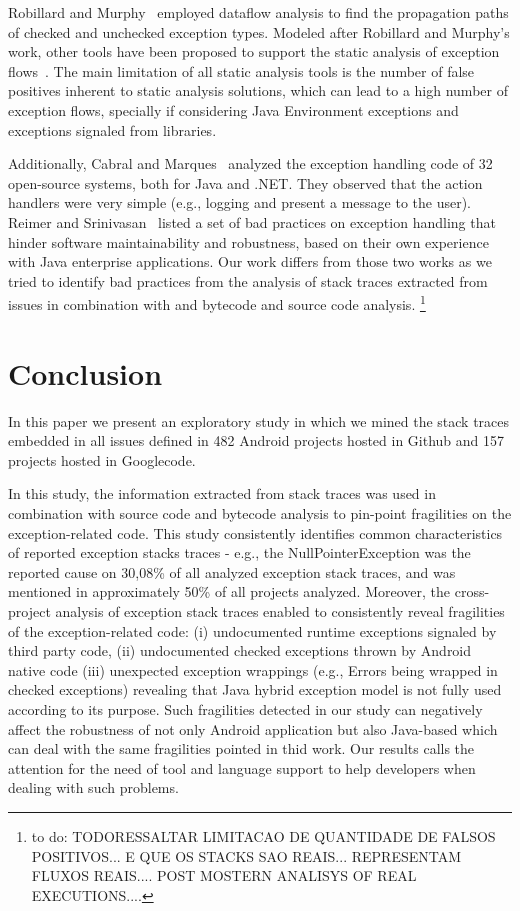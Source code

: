 \documentclass[conference]{IEEEtran}
\begin{document}
Robillard and Murphy~\cite{Robil00}
employed dataflow analysis to find the propagation paths of checked and
unchecked exception types. Modeled after Robillard and Murphy's work, other
tools have been proposed to support the static analysis of exception
flows~\cite{coelho2008assessing}. The main limitation of all
static analysis tools is the number of false positives inherent to static analysis
solutions, which can lead to a high number of exception flows, specially if
considering Java Environment exceptions and exceptions signaled from libraries.
 
Additionally, Cabral and Marques~\cite{cabral2007exception} analyzed the
exception handling code of 32 open-source systems, both for Java and .NET. They
observed that the action handlers were very simple (e.g., logging and present a
message to the user). Reimer and Srinivasan~\cite{reimer2003analyzing} listed a
set of bad practices on exception handling that hinder software maintainability
and robustness, based on their own experience with Java enterprise applications.
Our work differs from those two works as we tried to identify bad practices from
the analysis of stack traces extracted from issues in combination with and bytecode and source
code analysis. \footnote{ to do: TODORESSALTAR LIMITACAO DE QUANTIDADE DE FALSOS POSITIVOS... E QUE OS STACKS SAO REAIS...
REPRESENTAM FLUXOS REAIS.... POST MOSTERN ANALISYS OF REAL EXECUTIONS....}

\enlargethispage{-2\baselineskip}

\section{Conclusion}
\label{sec:conc}

In this paper we present an exploratory study in which we mined the stack 
traces embedded in all issues defined in 482 Android projects hosted in Github and 
157 projects hosted in Googlecode.

In this study, the information extracted from stack traces was used in combination 
with source code and bytecode analysis to pin-point fragilities on the exception-related
code. 
This study  consistently identifies common characteristics of reported 
exception stacks traces - e.g., the NullPointerException was the reported cause 
on 30,08\% of all analyzed exception stack traces, and was mentioned in approximately 
50\% of all projects analyzed. Moreover,  the cross-project analysis of exception stack traces 
enabled to consistently reveal  fragilities of the exception-related code: 
(i) undocumented runtime exceptions signaled by third party code,
(ii) undocumented checked exceptions thrown by Android native code
(iii) unexpected exception wrappings (e.g., Errors being wrapped in checked exceptions) 
revealing that Java hybrid exception model is not fully used according to its purpose.
Such fragilities detected in our study can negatively affect the 
robustness of not only Android application but also Java-based 
which can deal with the same fragilities pointed in thid work. 
Our results calls the attention for the need of tool and language support to help 
developers when dealing with such problems.
\end{document}
